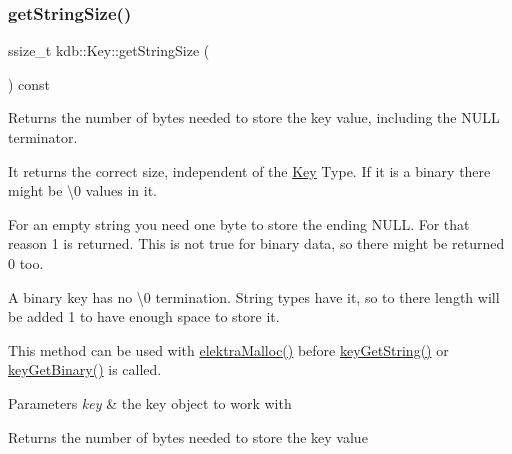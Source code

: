 \subsubsection{\texorpdfstring{getStringSize()}{getStringSize()}}
{\footnotesize\ttfamily ssize\+\_\+t kdb\+::\+Key\+::get\+String\+Size (\begin{DoxyParamCaption}{ }\end{DoxyParamCaption}) const\hspace{0.3cm}{\ttfamily [inline]}}



Returns the number of bytes needed to store the key value, including the N\+U\+LL terminator. 

It returns the correct size, independent of the \mbox{\hyperlink{classkdb_1_1Key}{Key}} Type. If it is a binary there might be \textquotesingle{}\textbackslash{}0\textquotesingle{} values in it.

For an empty string you need one byte to store the ending N\+U\+LL. For that reason 1 is returned. This is not true for binary data, so there might be returned 0 too.

A binary key has no \textquotesingle{}\textbackslash{}0\textquotesingle{} termination. String types have it, so to there length will be added 1 to have enough space to store it.

This method can be used with \mbox{\hyperlink{internal_8c_a35cdc2e5caed3454cb73b4fc7f37858c}{elektra\+Malloc()}} before \mbox{\hyperlink{group__keyvalue_ga41b9fac5ccddafe407fc0ae1e2eb8778}{key\+Get\+String()}} or \mbox{\hyperlink{group__keyvalue_ga4c0d8a4a11174197699c231e0b5c3c84}{key\+Get\+Binary()}} is called.


\begin{DoxyCode}{0}
\DoxyCodeLine{\textcolor{comment}{// use this buffer to store the value (binary or string)}}
\DoxyCodeLine{\textcolor{comment}{// pass keyGetValueSize (key) for maxSize}}
\end{DoxyCode}



\begin{DoxyParams}{Parameters}
{\em key} & the key object to work with \\
\hline
\end{DoxyParams}
\begin{DoxyReturn}{Returns}
the number of bytes needed to store the key value 
\end{DoxyReturn}

